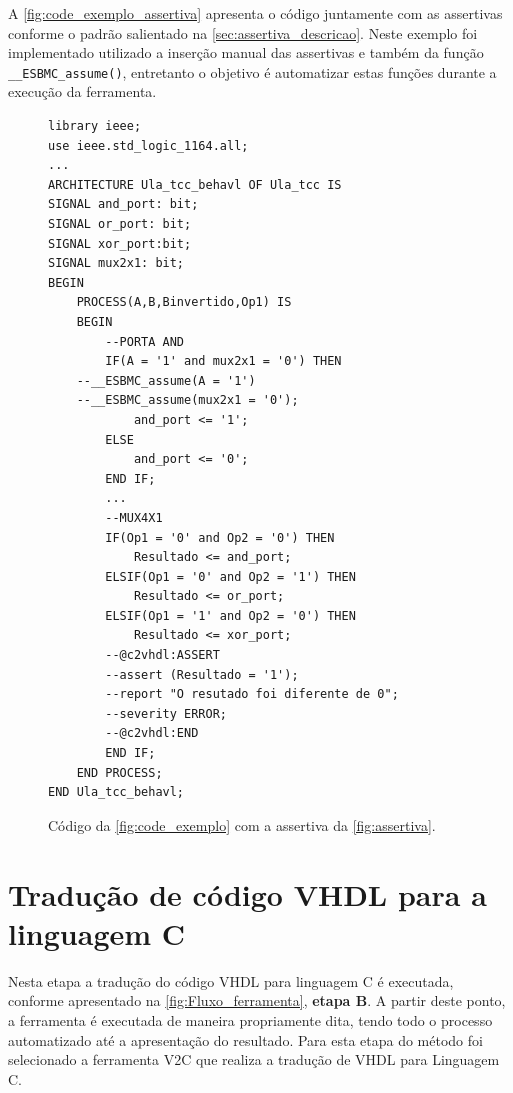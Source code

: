 \par
A \autoref{fig:code_exemplo_assertiva} apresenta o código juntamente com as assertivas conforme o padrão salientado na \autoref{sec:assertiva_descricao}. Neste exemplo foi implementado utilizado a inserção manual das assertivas e também da função \texttt{\_\_ESBMC\_assume()}, entretanto o objetivo é automatizar estas funções durante a execução da ferramenta.

\begin{figure}[h]
\caption{\label{fig:code_exemplo_assertiva} Código da \autoref{fig:code_exemplo} com a assertiva da \autoref{fig:assertiva}.}
	\begin{center}
    \begin{minipage}{0.99\textwidth}
    \begin{lstlisting}       
library ieee;
use ieee.std_logic_1164.all;
...
ARCHITECTURE Ula_tcc_behavl OF Ula_tcc IS
SIGNAL and_port: bit;
SIGNAL or_port: bit;
SIGNAL xor_port:bit;
SIGNAL mux2x1: bit;
BEGIN
	PROCESS(A,B,Binvertido,Op1) IS
	BEGIN
		--PORTA AND
		IF(A = '1' and mux2x1 = '0') THEN
    --__ESBMC_assume(A = '1')
    --__ESBMC_assume(mux2x1 = '0');
		    and_port <= '1';
		ELSE
		    and_port <= '0';
		END IF;
		...
		--MUX4X1
		IF(Op1 = '0' and Op2 = '0') THEN
			Resultado <= and_port;
		ELSIF(Op1 = '0' and Op2 = '1') THEN
			Resultado <= or_port;
		ELSIF(Op1 = '1' and Op2 = '0') THEN
			Resultado <= xor_port;
        --@c2vhdl:ASSERT
        --assert (Resultado = '1');
        --report "O resutado foi diferente de 0";
        --severity ERROR;
        --@c2vhdl:END
		END IF;
	END PROCESS;
END Ula_tcc_behavl;
    \end{lstlisting}
    \end{minipage}
	\end{center}
\end{figure}


\section{\label{cap:traducao}Tradução de código VHDL para a linguagem C}


\par
Nesta etapa a tradução do código VHDL para linguagem C é executada, conforme apresentado na \autoref{fig:Fluxo_ferramenta}, \textbf{etapa B}. A partir deste ponto, a ferramenta é executada de maneira propriamente dita, tendo todo o processo automatizado até a apresentação do resultado. Para esta etapa do método foi selecionado a ferramenta V2C que realiza a tradução de VHDL para Linguagem C.

